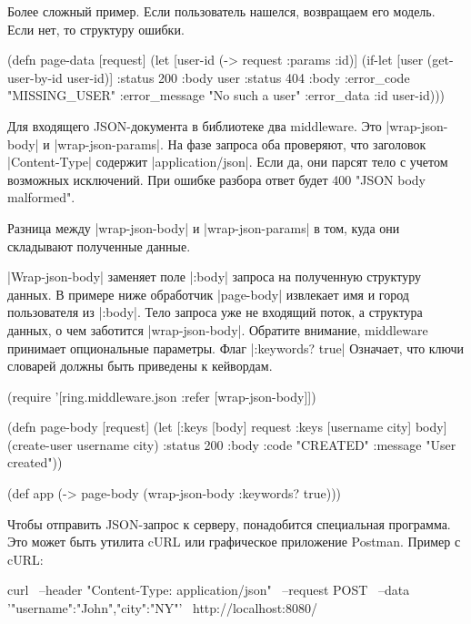 Более сложный пример. Если пользователь нашелся, возвращаем его модель. Если
нет, то структуру ошибки.

\begin{code}
(defn page-data
  [request]
  (let [user-id (-> request :params :id)]
    (if-let [user (get-user-by-id user-id)]
      {:status 200
       :body user}
      {:status 404
       :body {:error_code "MISSING_USER"
              :error_message "No such a user"
              :error_data {:id user-id}}})))
\end{code}

Для входящего JSON-документа в библиотеке два middleware. Это \spverb|wrap-json-body| и
\spverb|wrap-json-params|. На фазе запроса оба проверяют, что заголовок \spverb|Content-Type|
содержит \spverb|application/json|. Если да, они парсят тело с учетом возможных
исключений. При ошибке разбора ответ будет 400 "JSON body malformed".

Разница между \spverb|wrap-json-body| и \spverb|wrap-json-params| в том, куда они складывают
полученные данные.

\spverb|Wrap-json-body| заменяет поле \spverb|:body| запроса на полученную структуру данных. В
примере ниже обработчик \spverb|page-body| извлекает имя и город пользователя из
\spverb|:body|. Тело запроса уже не входящий поток, а структура данных, о чем заботится
\spverb|wrap-json-body|. Обратите внимание, middleware принимает опциональные
параметры. Флаг \spverb|:keywords? true| Означает, что ключи словарей должны быть
приведены к кейвордам.

\begin{code}
(require '[ring.middleware.json
           :refer [wrap-json-body]])

(defn page-body
  [request]
  (let [{:keys [body]} request
        {:keys [username city]} body]
    (create-user username city)
    {:status 200
     :body {:code "CREATED"
            :message "User created"}}))

(def app
  (-> page-body
      (wrap-json-body {:keywords? true})))
\end{code}

Чтобы отправить JSON-запрос к серверу, понадобится специальная программа. Это
может быть утилита cURL или графическое приложение Postman. Пример с cURL:

\begin{code}
curl \
  --header "Content-Type: application/json" \
  --request POST \
  --data '{"username":"John","city":"NY"}' \
  http://localhost:8080/
\end{code}


